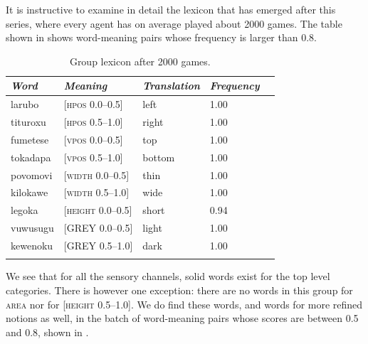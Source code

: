 It is instructive to examine in detail the lexicon 
that has emerged after this series, where every agent
has on average played about 2000 games. The table shown in  
shows word-meaning pairs whose 
frequency is larger than 0.8. 


\begin{table}
\begin{center}
\begin{tabular}{ l  l  l  l  l }
\lsptoprule
{\itshape Word}&{\itshape Meaning}& {\itshape Translation} & {\itshape Frequency} \\ \midrule
larubo & [\textsc{hpos} 0.0–0.5] & left & 1.00 \\ 
tituroxu & [\textsc{hpos} 0.5–1.0] & right & 1.00 \\ 
fumetese & [\textsc{vpos} 0.0–0.5] & top & 1.00 \\ 
tokadapa & [\textsc{vpos} 0.5–1.0] & bottom & 1.00 \\ 
povomovi & [\textsc{width} 0.0–0.5] & thin & 1.00 \\ 
kilokawe & [\textsc{width} 0.5–1.0] & wide & 1.00 \\ 
legoka & [\textsc{height} 0.0–0.5] & short & 0.94\\  
vuwusugu & [GREY 0.0–0.5] & light & 1.00 \\ 
kewenoku & [GREY 0.5–1.0] & dark & 1.00 \\ 
\lspbottomrule
\end{tabular}
\caption{\label{tab:after2000}Group lexicon after 2000 games.}
\end{center}
\end{table}

We see that for all the sensory channels, solid words
exist for the top level categories. There is however
one exception: there are no words in this group for \textsc{area}
nor for [\textsc{height} 0.5–1.0]. We do find these words, and 
words for more refined notions as well, in the 
batch of word-meaning pairs whose scores are between 0.5 and 0.8, shown 
in . 


